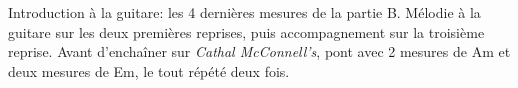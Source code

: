 Introduction à la guitare: les 4 dernières mesures de la partie B. Mélodie
à la guitare sur les deux premières reprises, puis accompagnement sur la
troisième reprise. Avant d'enchaîner sur \emph{Cathal McConnell's}, pont avec 2
mesures de Am et deux mesures de Em, le tout répété deux fois.

\tune
